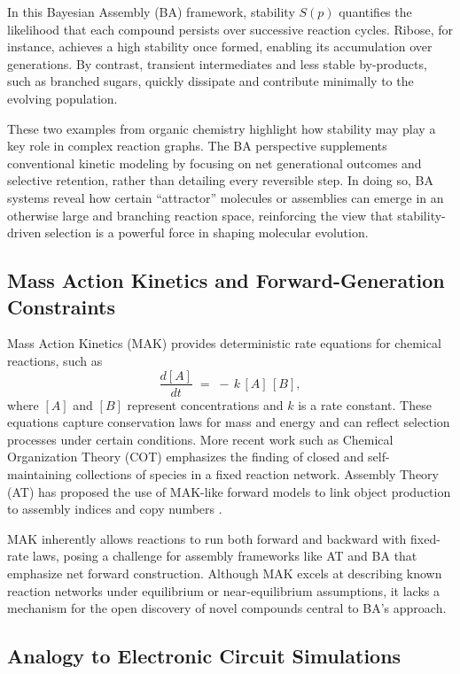 \documentclass[entropy,article,submit,pdftex,moreauthors]{Definitions/mdpi}
\begin{document}
In this Bayesian Assembly (BA) framework, stability $S(p)$ quantifies the likelihood that each compound persists over successive reaction cycles. Ribose, for instance, achieves a high stability once formed, enabling its accumulation over generations. By contrast, transient intermediates and less stable by-products, such as branched sugars, quickly dissipate and contribute minimally to the evolving population. 

These two examples from organic chemistry highlight how stability may play a key role in complex reaction graphs. The BA perspective supplements conventional kinetic modeling by focusing on net generational outcomes and selective retention, rather than detailing every reversible step. In doing so, BA systems reveal how certain ``attractor'' molecules or assemblies can emerge in an otherwise large and branching reaction space, reinforcing the view that stability-driven selection is a powerful force in shaping molecular evolution.

\subsection{Mass Action Kinetics and Forward-Generation Constraints}
\label{subsec:mak-forward-limitations}

Mass Action Kinetics (MAK) \cite{TuranyiTomlin2014} provides deterministic rate equations for chemical reactions, such as
\[
\frac{d[A]}{dt} \;=\; -\,k\, [A]\,[B],
\]
where $[A]$ and $[B]$ represent concentrations and $k$ is a rate constant. These equations capture conservation laws for mass and energy and can reflect selection processes under certain conditions. More recent work such as Chemical Organization Theory (COT) \cite{DittrichFenizio2005} emphasizes the finding of closed and self-maintaining collections of species in a fixed reaction network. Assembly Theory (AT) has proposed the use of MAK-like forward models to link object production to assembly indices and copy numbers \cite{walker2023nature}.

MAK inherently allows reactions to run both forward and backward with fixed-rate laws, posing a challenge for assembly frameworks like AT and BA that emphasize net forward construction. Although MAK excels at describing known reaction networks under equilibrium or near-equilibrium assumptions, it lacks a mechanism for the open discovery of novel compounds central to BA’s approach.

\subsection{Analogy to Electronic Circuit Simulations}
\label{subsec:spice-analogy}
\end{document}
